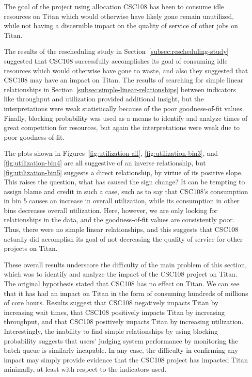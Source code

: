 


The goal of the project using allocation CSC108 has been to consume idle
resources on Titan which would otherwise have likely gone remain unutilized,
while not having a discernible impact on the quality of service of other jobs
on Titan.

The results of the rescheduling study in
Section~\ref{subsec:rescheduling-study} suggested that CSC108 successfully
accomplishes its goal of consuming idle resources which would otherwise have
gone to waste, and also they suggested that CSC108 may have an impact on Titan.
The results of searching for simple linear relationships in
Section~\ref{subsec:simple-linear-relationships} between indicators like
throughput and utilization provided additional insight, but the interpretations
were weak statistically because of the poor goodness-of-fit values. Finally,
blocking probability was used as a means to identify and analyze times of great
competition for resources, but again the interpretations were weak due to poor
goodness-of-fit.

The plots shown in Figures~\ref{fig:utilization-all},
\ref{fig:utilization-bin3}, and \ref{fig:utilization-bin4} are all suggestive
of an inverse relationship, but \ref{fig:utilization-bin5} suggests a direct
relationship, by virtue of its positive slope. This raises the question, what
has caused the sign change? It can be tempting to assign blame and credit in
such a case, such as to say that CSC108's consumption in bin 5 causes an
increase in overall utilization, while its consumption in other bins decreases
overall utilization. Here, however, we are only looking for relationships in
the data, and the goodness-of-fit values are consistently poor. Thus, there
were no simple linear relationships, and this suggests that CSC108 actually
did accomplish its goal of not decreasing the quality of service for other
projects on Titan.

These overall results underscore the difficulty of the main problem of this
section, which was to identify and analyze the impact of the CSC108 project on
Titan. The original hypothesis stated that CSC108 has no effect on Titan. We
can see that it has had an impact on Titan in the form of consuming hundreds
of millions of core hours. Results suggest that CSC108 negatively impacts
Titan by increasing wait times, that CSC108 positively impacts Titan by
increasing throughput, and that CSC108 positively impacts Titan by increasing
utilization. Interestingly, the inability to find simple relationships by
using blocking probability suggests that users' judging system performance by
monitoring the batch queue is similarly incapable. In any case, the difficulty
in confirming any impact may simply provide evidence that the CSC108 project
has impacted Titan minimally, at least with respect to the indicators used.


